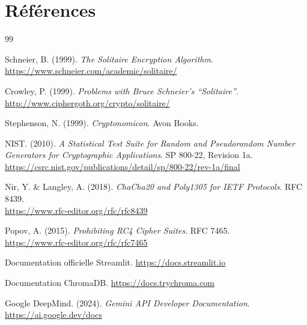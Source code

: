 \documentclass[12pt,a4paper]{article}
\begin{document}
\section*{Références}
\begin{thebibliography}{99}

Schneier, B. (1999). \textit{The Solitaire Encryption Algorithm}. \\
\url{https://www.schneier.com/academic/solitaire/}

Crowley, P. (1999). \textit{Problems with Bruce Schneier's ``Solitaire''}. \\
\url{http://www.ciphergoth.org/crypto/solitaire/}

Stephenson, N. (1999). \textit{Cryptonomicon}. Avon Books.

NIST. (2010). \textit{A Statistical Test Suite for Random and Pseudorandom Number Generators for Cryptographic Applications}. SP 800-22, Revision 1a. \\
\url{https://csrc.nist.gov/publications/detail/sp/800-22/rev-1a/final}

Nir, Y. \& Langley, A. (2018). \textit{ChaCha20 and Poly1305 for IETF Protocols}. RFC 8439. \\
\url{https://www.rfc-editor.org/rfc/rfc8439}

Popov, A. (2015). \textit{Prohibiting RC4 Cipher Suites}. RFC 7465. \\
\url{https://www.rfc-editor.org/rfc/rfc7465}

Documentation officielle Streamlit. \url{https://docs.streamlit.io}

Documentation ChromaDB. \url{https://docs.trychroma.com}

Google DeepMind. (2024). \textit{Gemini API Developer Documentation}. \\
\url{https://ai.google.dev/docs}

\end{thebibliography}
\end{document}
